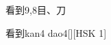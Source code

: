 \begin{entry}{看到}{9,8}{⽬、⼑}
  \begin{phonetics}{看到}{kan4 dao4}[][HSK 1]
  \end{phonetics}
\end{entry}
